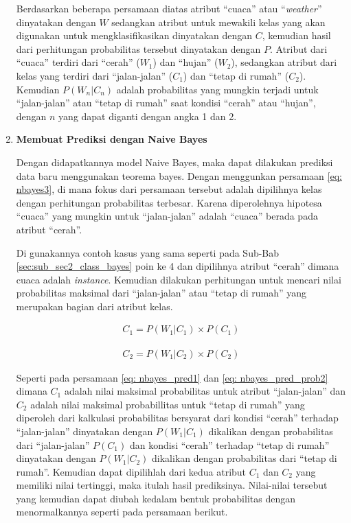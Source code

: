 \begin{enumerate}[label=\textbf{\arabic*).}]
	Berdasarkan beberapa persamaan diatas atribut ``cuaca'' atau ``\textit{weather}'' dinyatakan dengan $W$ sedangkan atribut untuk mewakili kelas yang akan digunakan untuk mengklasifikasikan dinyatakan dengan $C$, kemudian hasil dari perhitungan probabilitas tersebut dinyatakan dengan $P$. Atribut dari ``cuaca'' terdiri dari ``cerah'' ($W_{1}$) dan ``hujan'' ($W_{2}$), sedangkan atribut dari kelas yang terdiri dari ``jalan-jalan'' ($C_{1}$) dan ``tetap di rumah'' ($C_{2}$). Kemudian $P(W_{n}|C_{n})$ adalah probabilitas yang mungkin terjadi untuk ``jalan-jalan'' atau ``tetap di rumah'' saat kondisi ``cerah'' atau ``hujan'', dengan $n$ yang dapat diganti dengan angka 1 dan 2.
	\vspace{1ex}

	\item \textbf{Membuat Prediksi dengan Naive Bayes}

	Dengan didapatkannya model Naive Bayes, maka dapat dilakukan prediksi data baru menggunakan teorema bayes. Dengan menggunkan persamaan \ref{eq: nbayes3}, di mana fokus dari persamaan tersebut adalah dipilihnya kelas dengan perhitungan probabilitas terbesar. Karena diperolehnya hipotesa ``cuaca'' yang mungkin untuk ``jalan-jalan'' adalah ``cuaca'' berada pada atribut ``cerah''.
	\vspace{1ex}

	Di gunakannya contoh kasus yang sama seperti pada Sub-Bab \ref{sec:sub_sec2_class_bayes} poin ke 4 dan dipilihnya atribut ``cerah'' dimana cuaca adalah \textit{instance}. Kemudian dilakukan perhitungan untuk mencari nilai probabilitas maksimal dari ``jalan-jalan'' atau ``tetap di rumah'' yang merupakan bagian dari atribut kelas.

	\begin{equation}\label{eq: nbayes_pred1}
	\begin{split}
	C_{1} = P(W_{1}|C_{1}) \times P(C_{1})
	\end{split}
	\end{equation}
	
	\begin{equation}\label{eq: nbayes_pred2}
	\begin{split}
	C_{2} = P(W_{1}|C_{2}) \times P(C_{2})
	\end{split}
	\end{equation}

	Seperti pada persamaan \ref{eq: nbayes_pred1} dan \ref{eq: nbayes_pred_prob2} dimana $C_{1}$ adalah nilai maksimal probabilitas untuk atribut ``jalan-jalan'' dan $C_{2}$ adalah nilai maksimal probabillitas untuk ``tetap di rumah'' yang diperoleh dari kalkulasi probabilitas bersyarat dari kondisi ``cerah'' terhadap ``jalan-jalan'' dinyatakan dengan $P(W_{1}|C_{1})$ dikalikan dengan probabilitas dari ``jalan-jalan'' $P(C_{1})$ dan kondisi ``cerah'' terhadap ``tetap di rumah'' dinyatakan dengan $P(W_{1}|C_{2})$ dikalikan dengan probabilitas dari ``tetap di rumah''. Kemudian dapat dipilihlah dari kedua atribut $C_{1}$ dan $C_{2}$ yang memiliki nilai tertinggi, maka itulah hasil prediksinya. Nilai-nilai tersebut yang kemudian dapat diubah kedalam bentuk probabilitas dengan menormalkannya seperti pada persamaan berikut.


\end{enumerate}
